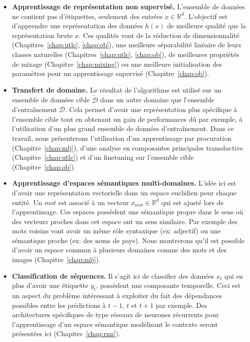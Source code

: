 \begin{itemize}

\item {\bf Apprentissage de représentation non supervisé.} L'ensemble de
données ne contient pas d'étiquettes, seulement des entrées $x\in\mathbb{R}^{d}$.
L'objectif est d'apprendre une représentation des données $h(x)$ de meilleure
qualité que la représentation brute $x$.  Ces qualités vont de la réduction de
dimensionnalité (Chapitres~\ref{chap:utlc}, \ref{chap:ob}), une meilleure
séparabilité linéaire de leurs classes naturelles (Chapitres~\ref{chap:utlc}, \ref{chap:ob}), de meilleures
propriétés de mixage (Chapitre~\ref{chap:mixing}) ou une meilleure
initialisation des paramètres pour un apprentissage supervisé
(Chapitre~\ref{chap:ob}). 
\\

\item {\bf Transfert de domaine.} Le résultat de l'algorithme est utilisé sur
un ensemble de données cible $\tilde{\mathcal{D}}$ dans un autre domaine que l'ensemble
d'entraînement $\mathcal{D}$. Cela permet d'avoir une représentation plus
spécifique à l'ensemble cible tout en obtenant un gain de performances dû par
exemple, à l'utilisation d'un plus grand ensemble de données d'entraînement.
Dans ce travail, nous présenterons l'utilisation d'un apprentissage par procuration
(Chapitre~\ref{chap:mlj}), d'une analyse en composantes principales transductive (Chapitre~\ref{chap:utlc}) et
d'un finetuning sur l'ensemble cible (Chapitre~\ref{chap:ob}).
\\

\item {\bf Apprentissage d'espaces sémantiques multi-domaines.} L'idée ici est
d'avoir une représentation vectorielle dans un espace euclidien pour chaque entité. Un
$mot$ est associé à un vecteur $x_{mot}\in\mathbb{R}^{d}$ qui est ajusté lors de l'apprentissage.
Ces espaces possèdent une sémantique propre dans le sens où des vecteurs proches
dans cet espace ont un sens similaire. Par exemple des mots voisins vont avoir
un même rôle syntaxique (ex: adjectif) ou une sémantique proche (ex: des noms de pays).
Nous montrerons qu'il est possible d'avoir un espace commun à plusieurs domaines
comme des mots et des images (Chapitre~\ref{chap:mlj}).
\\

\item {\bf Classification de séquences.} Il s'agit ici de classifier des
données $x_{t}$ qui en plus d'avoir une étiquette $y_{t}$, possèdent une composante
temporelle. Ceci est un aspect du problème intéressant à exploiter du fait des
dépendances possibles entre les prédictions à $t-1$, $t$ et $t+1$ par exemple.
Des architectures spécifiques de type réseaux de neurones récurrents pour
l'apprentissage d'un espace sémantique modélisant le contexte seront présentées
ici (Chapitre~\ref{chap:rnn}).

\end{itemize}

